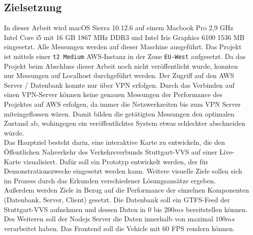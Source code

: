 \subsection{Zielsetzung}
\label{sub:zielsetzung}
  In dieser Arbeit wird macOS Sierra 10.12.6 auf einem Macbook Pro 2,9 GHz Intel Core i5 mit 16 GB 1867 MHz DDR3 und Intel Iris Graphics 6100 1536 MB eingesetzt. Alle Messungen werden auf dieser Maschine ausgeführt. Das Projekt ist mittels einer \texttt{t2 Medium} AWS-Instanz in der Zone \texttt{EU-West} aufgesetzt. Da das Projekt beim Abschluss dieser Arbeit noch nicht veröffentlicht wurde, konnten nur Messungen auf Localhost durchgeführt werden. Der Zugriff auf den AWS Server / Datenbank konnte nur über VPN erfolgen. Durch das Verbinden auf einen VPN-Server können keine genauen Messungen der Performance des Projektes auf AWS erfolgen, da immer die Netzwerkzeiten bis zum VPN Server miteingeflossen wären. Damit bilden die getätigten Messungen den optimalen Zustand ab, wohingegen ein veröffentlichtes System etwas schlechter abschneiden würde.\\

  Das Hauptziel besteht darin, eine interaktive Karte zu entwickeln, die den Öffentlichen Nahverkehr des Verkehrsverbunds Stuttgart-VVS auf einer Live-Karte visualisiert. Dafür soll ein Prototyp entwickelt werden, der für Demonstrationszwecke eingesetzt werden kann. Weitere visuelle Ziele sollen sich im Prozess durch das Erkunden verschiedener Lösungsansätze ergeben. \\

  Außerdem werden Ziele in Bezug auf die Performance der einzelnen Komponenten (Datenbank, Server, Client) gesetzt. Die Datenbank soll ein GTFS-Feed der Stuttgart-VVS aufnehmen und dessen Daten in $0$ bis $200ms$ bereitstellen können. Des Weiteren soll der Nodejs Server die Daten innerhalb von maximal $100ms$ verarbeitet haben. Das Frontend soll die Vehicle mit 60 FPS rendern können.

